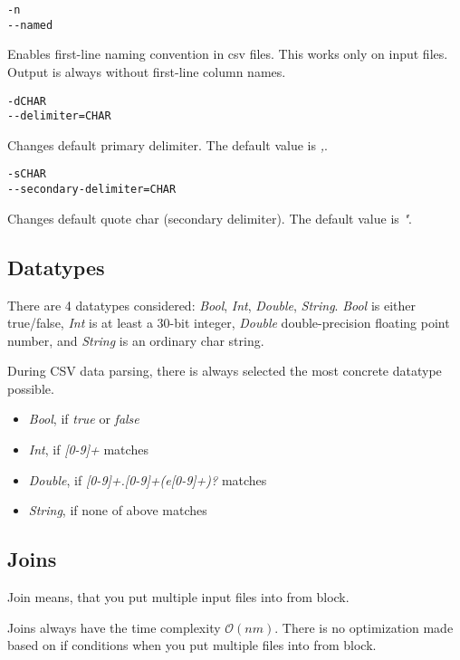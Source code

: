 \begin{verbatim}
-n
--named
\end{verbatim}
Enables first-line naming convention in csv files. This works only on input files. 
Output is always without first-line column names.

\begin{verbatim}
-dCHAR
--delimiter=CHAR
\end{verbatim}
Changes default primary delimiter. The default value is \textit{,}.

\begin{verbatim}
-sCHAR
--secondary-delimiter=CHAR
\end{verbatim}
Changes default quote char (secondary delimiter). The default value is \textit{"}.

\subsection{Datatypes}
There are 4 datatypes considered: \textit{Bool}, \textit{Int}, \textit{Double}, \textit{String}. 
\textit{Bool} is either true/false, \textit{Int} is at least a 30-bit integer, \textit{Double} double-precision floating point number, and \textit{String} is an ordinary char string.

During CSV data parsing, there is always selected the most concrete datatype possible.
\begin{itemize}
    \item \textit{Bool}, if \textit{true} or \textit{false}
    \item \textit{Int}, if \textit{[0-9]+} matches
    \item \textit{Double}, if \textit{[0-9]+.[0-9]+(e[0-9]+)?} matches
    \item \textit{String}, if none of above matches
\end{itemize}

\subsection{Joins}
Join means, that you put multiple input files into from block.

Joins always have the time complexity $\mathcal{O}(nm)$. There is no optimization made based on if conditions when you put multiple files into from block.

